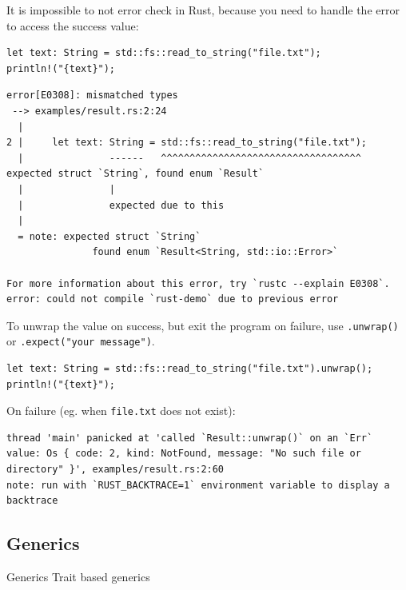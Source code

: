 \documentclass[
  9pt,
  ignorenonframetext,
]{beamer}
\newcommand{\passthrough}[1]{#1}
\begin{document}
\begin{frame}[fragile]
It is impossible to not error check in Rust, because you need to handle
the error to access the success value:

\begin{lstlisting}
let text: String = std::fs::read_to_string("file.txt");
println!("{text}");
\end{lstlisting}

\begin{lstlisting}
error[E0308]: mismatched types
 --> examples/result.rs:2:24
  |
2 |     let text: String = std::fs::read_to_string("file.txt");
  |               ------   ^^^^^^^^^^^^^^^^^^^^^^^^^^^^^^^^^^^ expected struct `String`, found enum `Result`
  |               |
  |               expected due to this
  |
  = note: expected struct `String`
               found enum `Result<String, std::io::Error>`

For more information about this error, try `rustc --explain E0308`.
error: could not compile `rust-demo` due to previous error
\end{lstlisting}
\end{frame}

\begin{frame}[fragile]
To unwrap the value on success, but exit the program on failure, use
\passthrough{\lstinline!.unwrap()!} or
\passthrough{\lstinline!.expect("your message")!}.

\begin{lstlisting}
let text: String = std::fs::read_to_string("file.txt").unwrap();
println!("{text}");
\end{lstlisting}

On failure (eg. when \passthrough{\lstinline!file.txt!} does not exist):

\begin{lstlisting}
thread 'main' panicked at 'called `Result::unwrap()` on an `Err` value: Os { code: 2, kind: NotFound, message: "No such file or directory" }', examples/result.rs:2:60
note: run with `RUST_BACKTRACE=1` environment variable to display a backtrace
\end{lstlisting}
\end{frame}

\hypertarget{generics}{%
\subsection{Generics}\label{generics}}

\begin{frame}{Generics}
Trait based generics
\end{frame}
\end{document}
